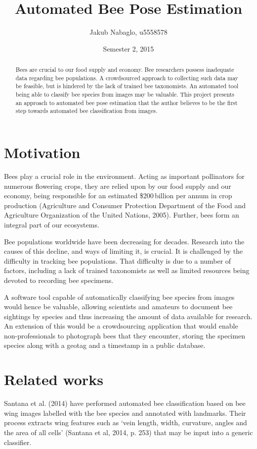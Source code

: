 \documentclass[11pt, oneside]{report}
\title{Automated Bee Pose Estimation}
\author{Jakub Nabaglo, u5558578}
\date{Semester 2, 2015}
\begin{document}
\maketitle

\begin{abstract}
    Bees are crucial to our food supply and economy. Bee researchers possess inadequate data regarding bee populations. A crowdsourced approach to collecting such data may be feasible, but is hindered by the lack of trained bee taxonomists. An automated tool being able to classify bee species from images may be valuable. This project presents an approach to automated bee pose estimation that the author believes to be the first step towards automated bee classification from images.
\end{abstract}

\tableofcontents\newpage

\chapter{Motivation}
    Bees play a crucial role in the environment. Acting as important pollinators for numerous flowering crops, they are relied upon by our food supply and our economy, being responsible for an estimated \$200\,billion per annum in crop production (Agriculture and Consumer Protection Department of the Food and Agriculture Organization of the United Nations, 2005). Further, bees form an integral part of our ecosystems.

    Bee populations worldwide have been decreasing for decades. Research into the causes of this decline, and ways of limiting it, is crucial. It is challenged by the difficulty in tracking bee populations. That difficulty is due to a number of factors, including a lack of trained taxonomists as well as limited resources being devoted to recording bee specimens.

    A software tool capable of automatically classifying bee species from images would hence be valuable, allowing scientists and amateurs to document bee sightings by species and thus increasing the amount of data available for research. An extension of this would be a crowdsourcing application that would enable non-professionals to photograph bees that they encounter, storing the specimen species along with a geotag and a timestamp in a public database.

\chapter{Related works}
    Santana et al. (2014) have performed automated bee classification based on bee wing images labelled with the bee species and annotated with landmarks. Their process extracts wing features such as `vein length, width, curvature, angles and the area of all cells' (Santana et al, 2014, p. 253) that may be input into a generic classifier.
\end{document}
